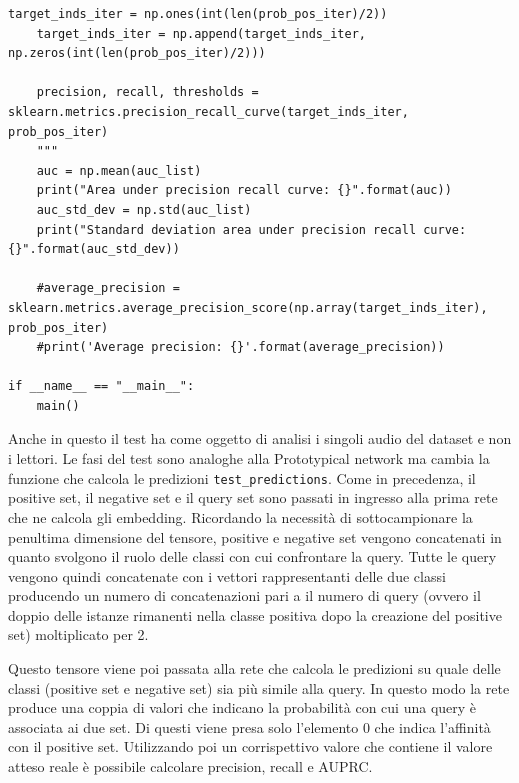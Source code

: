 \documentclass[12pt,a4paper,titlepage]{article}
\begin{document}
\begin{lstlisting}[language=iPython,firstnumber=1, caption=relation\_test.py, label=relation test,captionpos=b]
    target_inds_iter = np.ones(int(len(prob_pos_iter)/2))
    target_inds_iter = np.append(target_inds_iter, np.zeros(int(len(prob_pos_iter)/2)))

    precision, recall, thresholds = sklearn.metrics.precision_recall_curve(target_inds_iter, prob_pos_iter)
    """
    auc = np.mean(auc_list)
    print("Area under precision recall curve: {}".format(auc))
    auc_std_dev = np.std(auc_list)
    print("Standard deviation area under precision recall curve: {}".format(auc_std_dev))

    #average_precision = sklearn.metrics.average_precision_score(np.array(target_inds_iter), prob_pos_iter)
    #print('Average precision: {}'.format(average_precision))

if __name__ == "__main__":
    main()
\end{lstlisting}
Anche in questo il test ha come oggetto di analisi i singoli audio del dataset e non i lettori.
Le fasi del test sono analoghe alla Prototypical network ma cambia la funzione che calcola le predizioni \texttt{test\_predictions}.
Come in precedenza, il positive set, il negative set e il query set sono passati in ingresso alla prima rete che ne calcola gli embedding.
Ricordando la necessità di sottocampionare la penultima dimensione del tensore, positive e negative set vengono concatenati in quanto svolgono il ruolo delle classi con cui confrontare la query.
Tutte le query vengono quindi concatenate con i vettori rappresentanti delle due classi producendo un numero di concatenazioni pari a il numero di query (ovvero il doppio delle istanze rimanenti nella classe positiva dopo la creazione del positive set) moltiplicato per 2.

Questo tensore viene poi passata alla rete che calcola le predizioni su quale delle classi (positive set e negative set) sia più simile alla query. In questo modo la rete produce una coppia di valori che indicano la probabilità con cui una query è associata ai due set.
Di questi viene presa solo l'elemento 0 che indica l'affinità con il positive set.
Utilizzando poi un corrispettivo valore che contiene il valore atteso reale è possibile calcolare precision, recall e AUPRC.
\clearpage
\nocite{*}
\printbibliography
\end{document}
